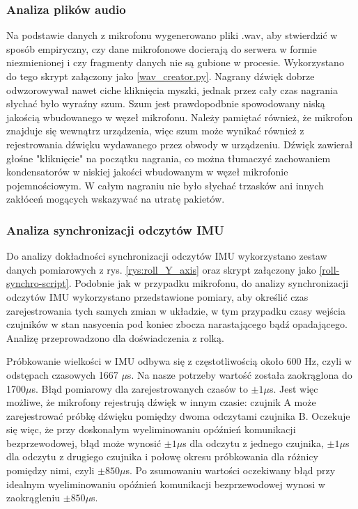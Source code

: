 \documentclass[12pt,oneside,a4paper]{book}
\theoremstyle{break}
\begin{document}
\subsubsection{Analiza plików audio}
Na podstawie danych z mikrofonu wygenerowano pliki .wav, aby
stwierdzić w sposób empiryczny, czy dane mikrofonowe docierają
do serwera w formie niezmienionej i czy fragmenty danych nie 
są gubione w procesie. Wykorzystano do tego skrypt załączony jako
\ref*{wav_creator.py}. Nagrany dźwięk dobrze odwzorowywał nawet ciche
kliknięcia myszki, jednak przez cały czas nagrania słychać było 
wyraźny szum. Szum jest prawdopodbnie spowodowany niską jakością
wbudowanego w węzeł mikrofonu. Należy pamiętać również, że
mikrofon znajduje się wewnątrz urządzenia, więc szum może wynikać 
również z rejestrowania dźwięku wydawanego przez obwody w urządzeniu.
Dźwięk zawierał głośne "kliknięcie" na początku
nagrania, co można tłumaczyć zachowaniem kondensatorów w niskiej
jakości wbudowanym w węzeł mikrofonie pojemnościowym.
W całym nagraniu nie było słychać trzasków ani innych
zakłóceń mogących wskazywać na utratę pakietów.

\subsubsection{Analiza synchronizacji odczytów IMU}
Do analizy dokładności synchronizacji odczytów IMU 
wykorzystano zestaw danych pomiarowych z rys. \ref{rys:roll_Y_axis}
oraz skrypt załączony jako \ref*{roll-synchro-script}.
Podobnie jak w przypadku mikrofonu, do analizy synchronizacji
odczytów IMU wykorzystano przedstawione pomiary, aby określić 
czas zarejestrowania
tych samych zmian w układzie, w tym przypadku czasy wejścia 
czujników w stan nasycenia pod koniec zbocza narastającego
bądź opadającego. Analizę przeprowadzono dla doświadczenia
z rolką. 
\par Próbkowanie wielkości w IMU odbywa się z częstotliwością około 
600 Hz, czyli w odstępach czasowych 1667 $\mu$s.
Na nasze potrzeby wartość została zaokrąglona
do 1700$\mu$s.
Błąd pomiarowy dla zarejestrowanych czasów to $\pm1\mu$s. 
Jest więc możliwe, że mikrofony rejestrują dźwięk 
w innym czasie: czujnik A może zarejestrować próbkę dźwięku
pomiędzy dwoma odczytami czujnika B.
Oczekuje się więc, że przy doskonałym wyeliminowaniu    
opóźnień komunikacji bezprzewodowej, błąd może wynosić $\pm1\mu$s dla 
odczytu z jednego czujnika, $\pm1\mu$s dla odczytu z drugiego czujnika i
połowę okresu próbkowania dla różnicy pomiędzy nimi, czyli $\pm850\mu$s.
Po zsumowaniu wartości oczekiwany błąd przy idealnym wyeliminowaniu 
opóźnień komunikacji bezprzewodowej
wynosi w zaokrągleniu $\pm850\mu$s. 
\end{document}
